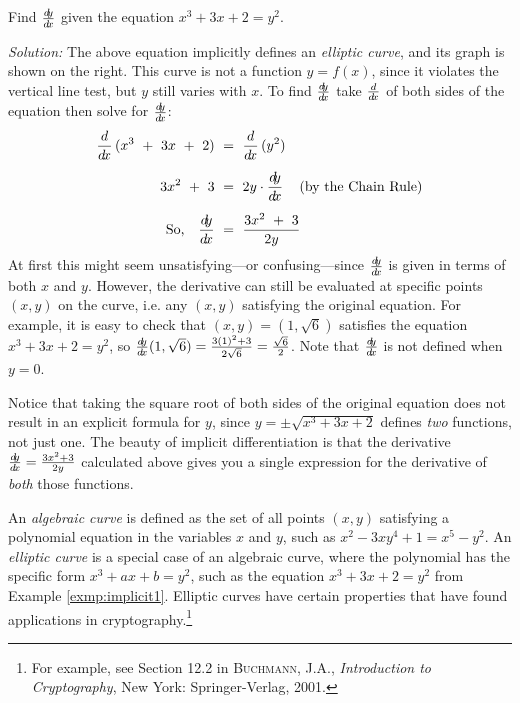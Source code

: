 \begin{exmp}\label{exmp:implicit1}
\parpic[r]{}
\noindent Find $\frac{d\negmedspace y}{d\!x}$ given the equation $x^3 + 3x + 2 = y^2$.\vspace{1mm}
\par\noindent\emph{Solution:} The above equation implicitly defines an
\emph{elliptic curve}, and its graph is shown on the
right. This curve is not a function $y=f(x)$, since it
violates the vertical line test, but $y$ still varies with $x$. To find
$\frac{d\negmedspace y}{d\!x}$ take $\frac{d}{d\!x}$ of both sides of the equation then solve for $\frac{d\negmedspace y}{d\!x}$:
\begin{align*}
\frac{d}{d\!x}\,(x^3 ~+~ 3x ~+~ 2) ~&=~ \frac{d}{d\!x}\,(y^2)\\[5pt]
3x^2 ~+~ 3 ~&=~ 2y \cdot \frac{d\negmedspace y}{d\!x} \quad\left(\text{by the Chain Rule}\right)\\[5pt]
\text{So,}\quad \frac{d\negmedspace y}{d\!x} ~&=~ \frac{3x^2 ~+~ 3}{2y}
\end{align*}\vspace{-6mm}
At first this might seem unsatisfying---or confusing---since $\frac{d\negmedspace y}{d\!x}$ is given
in terms of both $x$ and $y$. However, the derivative can still
be evaluated at specific points $(x,y)$ on the curve, i.e. any $(x,y)$
satisfying the original equation. For example, it is easy to check that
$(x,y) = (1,\sqrt{6})$ satisfies the equation $x^3 + 3x + 2 = y^2$, so
$\frac{d\negmedspace y}{d\!x}(1,\sqrt{6}) = \frac{3(1)^2 + 3}{2\sqrt{6}} = \frac{\sqrt{6}}{2}$. Note
that $\frac{d\negmedspace y}{d\!x}$ is not defined when $y=0$.

Notice that taking the square root of both sides of the original equation does
not result in an explicit formula for $y$, since $y = \pm \sqrt{x^3 + 3x + 2}$
defines \emph{two} functions, not just one. The beauty of implicit
differentiation is that the derivative $\frac{d\negmedspace y}{d\!x} = \frac{3x^2 + 3}{2y}$ calculated
above gives you a single expression for the derivative of \emph{both} those
functions.
\end{exmp}
\divider
\newpage
An \emph{algebraic curve} is defined as the set of all
points $(x,y)$ satisfying a polynomial equation in the variables $x$ and $y$,
such as $x^2 - 3xy^4 + 1 = x^5 - y^2$. An \emph{elliptic curve} is a special
case of an algebraic curve, where the polynomial has the specific form
$x^3 + ax + b = y^2$, such as the equation $x^3 + 3x + 2 = y^2$ from Example
\ref{exmp:implicit1}. Elliptic curves have certain properties that have found
applications in cryptography.\footnote{For example, see Section 12.2 in
\textsc{Buchmann, J.A.}, \emph{Introduction to Cryptography}, New York:
Springer-Verlag, 2001.}

